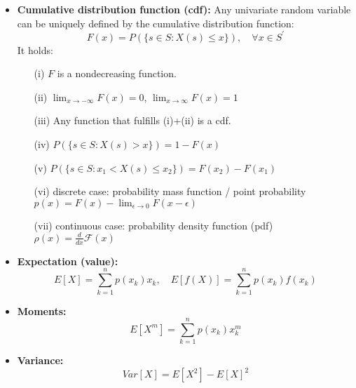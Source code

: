 \documentclass[11pt]{article}
\begin{document}
\begin{itemize}



\item {\bf Cumulative distribution function (cdf):} 
Any univariate random variable can be uniquely defined by the cumulative distribution function:
$$
F(x) = P(\{s \in S: X(s) \le x\}), \quad \forall x \in S^\prime
$$
It holds:
\begin{itemize}
\item[(i)] $F$ is a nondecreasing function.
\item[(ii)] $\lim_{x\to -\infty} F(x)= 0$, $\lim_{x\to \infty} F(x)= 1$
\item[(iii)] Any function that fulfills (i)+(ii) is a cdf.
\item[(iv)] $ P(\{s \in S: X(s) > x\}) = 1-F(x)$
\item[(v)] $ P(\{s \in S: x_1 < X(s) \le x_2\}) = F(x_2)-F(x_1)$
\item[(vi)] discrete case: probability mass function / point probability $p(x) = F(x) - \lim_{\epsilon \to 0}F(x-\epsilon)$
\item[(vii)] continuous case: probability density function (pdf) $\rho(x) = \frac{d}{dx} \mathcal{F}(x)$
\end{itemize}


\item {\bf Expectation (value):} 
$$
E[X] = \sum_{k=1}^n p(x_k) x_k , \quad E[f(X)] = \sum_{k=1}^n p(x_k) f(x_k) 
$$
\item {\bf Moments:} 
$$
E[X^m] =  \sum_{k=1}^n p(x_k) x_k^m
$$
\item {\bf Variance:} 
$$
Var[X]= E[X^2]-E[X]^2
$$

\end{itemize}
\vfil 
\end{document}
